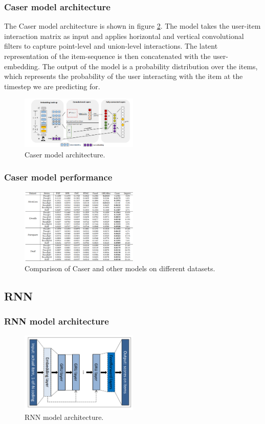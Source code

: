 \documentclass{ieeetj}
\begin{document}
\subsubsection{Caser model architecture}
\label{sec: caser-architecture}

The Caser model architecture is shown in figure \ref{fig:caser-architecture}. The model takes the user-item interaction matrix as input and applies horizontal and vertical convolutional filters to capture point-level and union-level interactions. The latent representation of the item-sequence is then concatenated with the user-embedding. The output of the model is a probability distribution over the items, which represents the probability of the user interacting with the item at the timestep we are predicting for.
\begin{figure}[h]
\centering
\includegraphics[width=0.5\textwidth]{figures/caser-architecture.png}
\caption{Caser model architecture.}
\label{fig:caser-architecture}
\end{figure}

\subsubsection{Caser model performance}
\begin{figure}[h]
	\centering
	\includegraphics[width=0.5\textwidth]{figures/caser-performance.png}
	\caption{Comparison of Caser and other models on different datasets.}
	\label{fig:caser-architecture}
\end{figure}
\FloatBarrier

\subsection{RNN}
\subsubsection{RNN model architecture}
\begin{figure}[h]
\centering
\includegraphics[width=0.5\textwidth]{figures/rnn-architecture.png}
\caption{RNN model architecture.}
\label{fig:rnn}
\end{figure}
\end{document}

